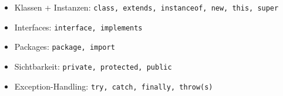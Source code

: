 \begin{itemize}
	\item Klassen + Instanzen: \verb|class, extends, instanceof, new, this, super|
	\item Interfaces: \verb|interface, implements|
	\item Packages: \verb|package, import|
	\item Sichtbarkeit: \verb|private, protected, public|
	\item Exception-Handling: \verb|try, catch, finally, throw(s)|
\end{itemize}